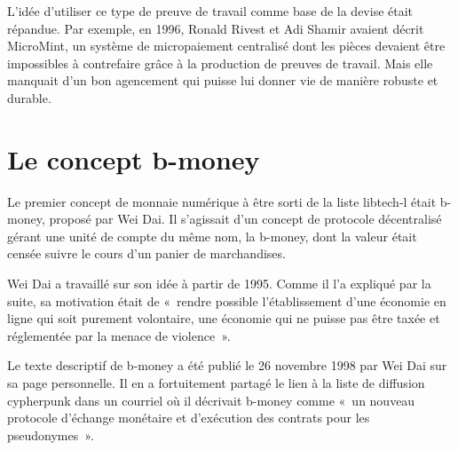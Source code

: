 L'idée d'utiliser ce type de preuve de travail comme base de la devise était répandue. Par exemple, en 1996, Ronald Rivest et Adi Shamir avaient décrit MicroMint, un système de micropaiement centralisé dont les pièces devaient être impossibles à contrefaire grâce à la production de preuves de travail. Mais elle manquait d'un bon agencement qui puisse lui donner vie de manière robuste et durable.

\section*{Le concept b-money} %

Le premier concept de monnaie numérique à être sorti de la liste libtech-l était b-money, proposé par Wei Dai. Il s'agissait d'un concept de protocole décentralisé gérant une unité de compte du même nom, la b-money, dont la valeur était censée suivre le cours d'un panier de marchandises.

Wei Dai a travaillé sur son idée à partir de 1995. Comme il l'a expliqué par la suite, sa motivation était de «~rendre possible l'établissement d'une économie en ligne qui soit purement volontaire, une économie qui ne puisse pas être taxée et réglementée par la menace de violence~». %

Le texte descriptif de b-money a été publié le 26 novembre 1998 par Wei Dai sur sa page personnelle. Il en a fortuitement partagé le lien à la liste de diffusion cypherpunk dans un courriel où il décrivait b-money comme «~un nouveau protocole d'échange monétaire et d'exécution des contrats pour les pseudonymes~». %

